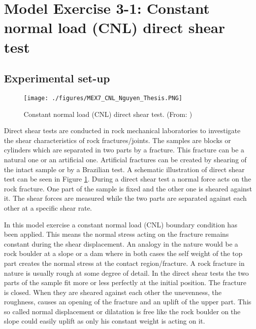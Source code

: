 \section{Model Exercise 3-1: Constant normal load (CNL) direct shear test}
\label{sec:mex07}
\subsection{Experimental set-up}
\begin{figure}[!ht]
\begin{center}
\texttt{[image: ./figures/MEX7\_CNL\_Nguyen\_Thesis.PNG]}
\end{center}
\caption{Constant normal load (CNL) direct shear test. (From: \cite{Nguyen2014})}
\label{fig:MEX7_CNL}
\end{figure}
Direct shear tests are conducted in rock mechanical laboratories to investigate the shear characteristics of rock fractures/joints. The samples are blocks or cylin\-ders which are separated in two parts by a fracture. This fracture can be a natural one or an artificial one. Artificial fractures can be created by shearing of the intact sample or by a Brazilian test.
%
A schematic illustration of direct shear test can be seen in Figure \ref{fig:MEX7_CNL}. During a direct shear test a normal force acts on the rock fracture. One part of the sample is fixed and the other one is sheared against it. The shear forces are measured while the two parts are separated against each other at a specific shear rate.

In this model exercise a constant normal load (CNL) boundary condition has been applied. This means the normal stress acting on the fracture remains constant during the shear displacement. An analogy in the nature would be a rock boulder at a slope or a dam where in both cases the self weight of the top part creates the normal stress at the contact region/fracture.
%
A rock fracture in nature is usually rough at some degree of detail. In the direct shear tests the two parts of the sample fit more or less perfectly at the initial position. The fracture is closed. When they are sheared against each other the unevenness, the roughness, causes an opening of the fracture and an uplift of the upper part. This so called normal displacement or dilatation is free like the rock boulder on the slope could easily uplift as only his constant weight is acting on it.

